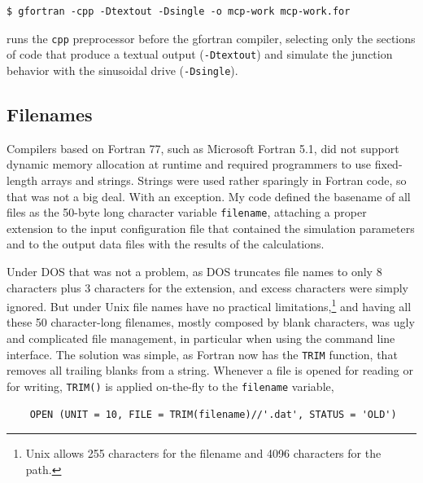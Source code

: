 \begin{verbatim}
$ gfortran -cpp -Dtextout -Dsingle -o mcp-work mcp-work.for
\end{verbatim}

runs the \texttt{cpp} preprocessor before the gfortran compiler, selecting only the sections of code that produce a textual output (\texttt{-Dtextout}) and simulate the junction behavior with the sinusoidal drive (\texttt{-Dsingle}).



\subsection{Filenames}

Compilers based on Fortran 77, such as Microsoft Fortran 5.1, did not support dynamic memory allocation at runtime and required programmers to use fixed-length arrays and strings. Strings were used rather sparingly in Fortran code, so that was not a big deal. With an exception. 
My code defined the basename of all files as the 50-byte long character variable \texttt{filename}, attaching a proper extension to the input configuration file that contained the simulation parameters and to the output data files with the results of the calculations.

Under DOS that was not a problem, as DOS truncates file names to only 8 characters plus 3 characters for the extension, and excess characters were simply ignored. But under Unix file names have no practical limitations,\footnote{Unix allows 255 characters for the filename and 4096 characters for the path.} and having all these 50 character-long filenames, mostly composed by blank characters, was ugly and complicated file management, in particular when using the command line interface.
The solution was simple, as Fortran now has the \texttt{TRIM} function, that removes all trailing blanks from a string. 
Whenever a file is opened for reading or for writing, \texttt{TRIM()} is applied on-the-fly to the \texttt{filename} variable,

\begin{verbatim}
	OPEN (UNIT = 10, FILE = TRIM(filename)//'.dat', STATUS = 'OLD')
\end{verbatim}

